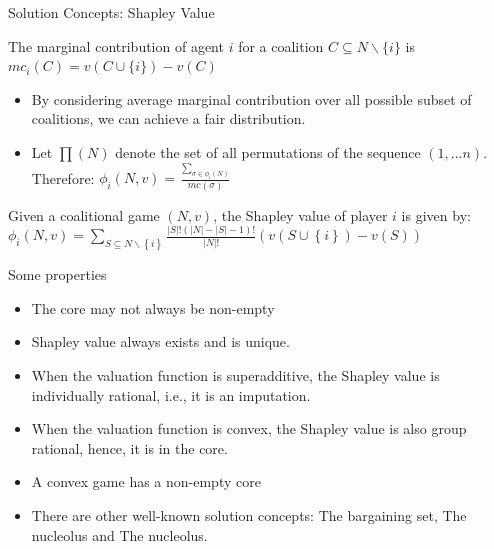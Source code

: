 \documentclass{beamer}
\begin{document}
\begin{frame}{Solution Concepts: Shapley Value}
    \begin{definition} \label{dfn:marginalcontribution}
        The {\color{red}marginal contribution} of agent $i$ for a coalition $C \subseteq N \backslash \{i\}$ is $mc_i(C) = v(C \cup \{i\}) - v(C)$
    \end{definition}
    
    \begin{itemize}
        \item By considering average marginal contribution over all possible subset of coalitions, we can achieve a fair distribution.\\
        \item Let $\prod(N)$ denote the set of all permutations of the sequence $(1,...n)$. Therefore: $\phi_i(N,v) = \frac{\sum_{\sigma \in \phi_i(N)}}{mc(\sigma)}$
    \end{itemize}

    \begin{definition} \label{dfn:shapleyvalue}
        Given a coalitional game $(N,v)$, the Shapley value of player $i$ is given by: \\
        $\phi_i(N,v) = \sum_{S \subseteq N \backslash \left\{i\right\} } \frac{|S|! (|N|-|S|-1)!}{|N|!} (v(S \cup \left\{i\right\}) - v(S))$
    \end{definition}
\end{frame}
\begin{frame}{Some properties}
    \begin{itemize}
        \item The core may not always be non-empty
        \item Shapley value always exists and is unique.
        \item When the valuation function is {\color{red}superadditive}, the Shapley value is {\color{red}individually rational}, i.e., it is an imputation.
        \item When the valuation function is {\color{red}convex}, the Shapley value is also group rational, hence, it is in the {\color{red}core}.        
        \item A convex game has a non-empty core
        \item There are other well-known solution concepts: The bargaining set, The nucleolus and The nucleolus.
    \end{itemize}
\end{frame}
\end{document}
